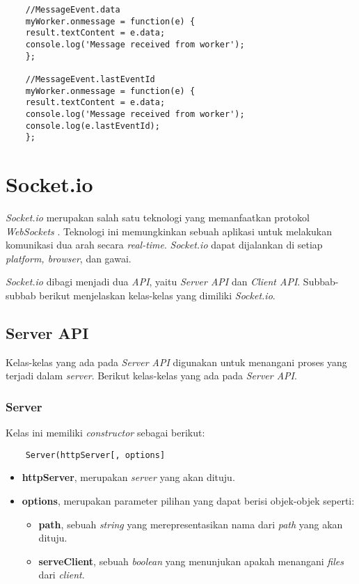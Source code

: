 \begin{lstlisting}
	//MessageEvent.data
	myWorker.onmessage = function(e) {
	result.textContent = e.data;
	console.log('Message received from worker');
	};
	
	//MessageEvent.lastEventId
	myWorker.onmessage = function(e) {
	result.textContent = e.data;
	console.log('Message received from worker');
	console.log(e.lastEventId);
	};
\end{lstlisting}



\section{Socket.io}
\label{sec:Socket.io}

\textit{Socket.io} merupakan salah satu teknologi yang memanfaatkan protokol \textit{WebSockets} \cite{socketio}. Teknologi ini memungkinkan sebuah aplikasi untuk melakukan komunikasi dua arah secara \textit{real-time}. \textit{Socket.io} dapat dijalankan di setiap \textit{platform, browser}, dan gawai.

\textit{Socket.io} dibagi menjadi dua \textit{API}, yaitu \textit{Server API} dan \textit{Client API}. Subbab-subbab berikut menjelaskan kelas-kelas yang dimiliki \textit{Socket.io}.

\subsection{Server API}
Kelas-kelas yang ada pada \textit{Server API} digunakan untuk menangani proses yang terjadi dalam \textit{server}\cite{socketioserver}. Berikut kelas-kelas yang ada pada \textit{Server API}.

\subsubsection{Server}
Kelas ini memiliki \textit{constructor} sebagai berikut:
\begin{lstlisting}
	Server(httpServer[, options]
\end{lstlisting}
 
	\begin{itemize}
		\item \textbf{httpServer}, merupakan \textit{server} yang akan dituju.
		\item \textbf{options}, merupakan parameter pilihan yang dapat berisi objek-objek seperti: 
			\begin{itemize}
				\item \textbf{path}, sebuah \textit{string} yang merepresentasikan nama dari \textit{path} yang akan dituju.
				\item \textbf{serveClient}, sebuah \textit{boolean} yang menunjukan apakah menangani \textit{files} dari \textit{client}.
			\end{itemize}
	\end{itemize}
	
